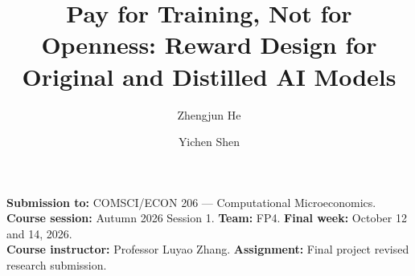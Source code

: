 \documentclass[sigconf,nonacm,10pt]{acmart}
\title{Pay for Training, Not for Openness: Reward Design for Original and Distilled AI Models}
\author{Zhengjun He}
\affiliation{\institution{Duke Kunshan University}\city{Kunshan}\country{China}}
\author{Yichen Shen}
\affiliation{\institution{Duke Kunshan University}\city{Kunshan}\country{China}}
\newcommand{\CourseNumber}{COMSCI/ECON 206}
\newcommand{\CourseName}{Computational Microeconomics}
\newcommand{\CourseSession}{Autumn 2026 Session 1}
\newcommand{\Instructor}{Professor Luyao Zhang}
\newcommand{\TeamCode}{FP4}
\newcommand{\coursemeta}{\noindent\textbf{Submission to:} \CourseNumber{} --- \CourseName.\\
\textbf{Course session:} \CourseSession. \textbf{Team:} \TeamCode. \textbf{Final week:} October 12 and 14, 2026.\\
\textbf{Course instructor:} \Instructor. \textbf{Assignment:} Final project revised research submission.\par\smallskip}
\begin{document}
\begin{teaserfigure}
\captionsetup{skip=8pt}
\centering

\caption{One integrated final-project evidence chain: economics fixes the four decisions and the reward rule, computation checks whether distillation creates capability, and behavior shows how firms choose.}
\label{fig:teaser}
\end{teaserfigure}
\maketitle\raggedbottom\coursemeta



\end{document}
